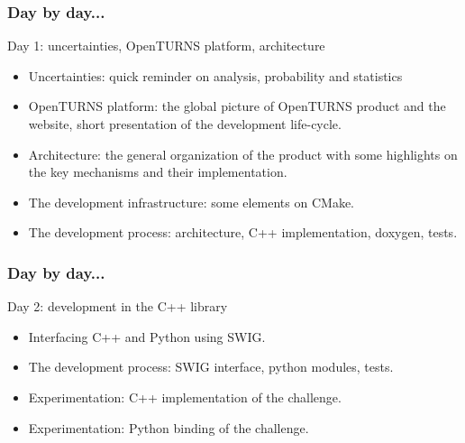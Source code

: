 \documentclass{beamer}
\begin{document}
\begin{frame}
  \frametitle{Day by day...}
  \begin{block}{Day 1: uncertainties, OpenTURNS platform, architecture}
    \begin{itemize}
    \item Uncertainties: quick reminder on analysis, probability and statistics
    \item OpenTURNS platform: the global picture of OpenTURNS product and the website, short presentation of the development life-cycle.
    \item Architecture: the general organization of the product with some highlights on the key mechanisms and their implementation.
    \item The development infrastructure: some elements on CMake.
    \item The development process: architecture, C++ implementation, doxygen, tests.
    \end{itemize}
  \end{block}
\end{frame}
\begin{frame}
  \frametitle{Day by day...}
  \begin{block}{Day 2: development in the C++ library}
    \begin{itemize}
 \item Interfacing C++ and Python using SWIG.
 \item The development process: SWIG interface, python modules, tests.
 \item Experimentation: C++ implementation of the challenge.
 \item Experimentation: Python binding of the challenge.
\end{itemize}
  \end{block}
\end{frame}
\end{document}
